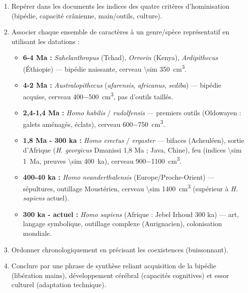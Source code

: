 \documentclass[11pt]{article}
\newcommand{\cle}[1]{{\popxbold\color{popdark}#1}}
\begin{document}
\begin{methode}
\begin{enumerate}
\item \cle{Repérer} dans les documents les indices des quatre critères d'hominisation (bipédie, capacité crânienne, main/outils, culture).
\item \cle{Associer} chaque ensemble de caractères à un genre/spèce représentatif en utilisant les datations :
\begin{itemize}
\item \textbf{6-4 Ma :} \emph{Sahelanthropus} (Tchad), \emph{Orrorin} (Kenya), \emph{Ardipithecus} (Éthiopie) — bipédie naissante, cerveau \SI{\sim 350}{cm^3}.
\item \textbf{4-2 Ma :} \emph{Australopithecus} (\emph{afarensis}, \emph{africanus}, \emph{sediba}) — bipédie acquise, cerveau \SI{400-500}{cm^3}, pas d'outils taillés.
\item \textbf{2,4-1,4 Ma :} \emph{Homo habilis} / \emph{rudolfensis} — premiers outils (Oldowayen : galets aménagés, éclats), cerveau \SI{600-750}{cm^3}.
\item \textbf{1,8 Ma - 300 ka :} \emph{Homo erectus} / \emph{ergaster} — bifaces (Acheuléen), sortie d'Afrique (\emph{H. georgicus} Dmanissi 1,8 Ma ; Java, Chine), feu (indices \SI{\sim 1}{Ma}, preuves \SI{\sim 400}{ka}), cerveau \SI{900-1100}{cm^3}.
\item \textbf{400-40 ka :} \emph{Homo neanderthalensis} (Europe/Proche-Orient) — sépultures, outillage Moustérien, cerveau \SI{\sim 1400}{cm^3} (supérieur à \emph{H. sapiens} actuel).
\item \textbf{300 ka - actuel :} \emph{Homo sapiens} (Afrique : Jebel Irhoud 300 ka) — art, langage symbolique, outillage complexe (Aurignacien), colonisation mondiale.
\end{itemize}
\item \cle{Ordonner} chronologiquement en précisant les coexistences (buissonnant).
\item \cle{Conclure} par une phrase de synthèse reliant acquisition de la bipédie (libération mains), développement cérébral (capacités cognitives) et essor culturel (adaptation technique).
\end{enumerate}
\end{methode}
\end{document}
